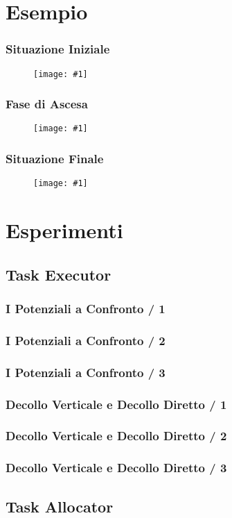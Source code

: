 \documentclass{beamer}
\newcommand{\putimage}[2] {
  \begin{figure}
    \centering
    \texttt{[image: \#1]}
	\end{figure}
}
\begin{document}
\section{Esempio}

\begin{frame}
\frametitle{Situazione Iniziale}
\putimage{images/esempio/iterazione\_zero\_left.png}{0.9}
\end{frame}

\begin{frame}
\frametitle{Fase di Ascesa}
\putimage{images/esempio/iterazione\_venti\_left.png}{0.9}
\end{frame}

\begin{frame}
\frametitle{Situazione Finale}
\putimage{images/esempio/iterazione\_finale\_top.png}{0.9}
\end{frame}

\section{Esperimenti}

\subsection{Task Executor}

\begin{frame}
\frametitle{I Potenziali a Confronto / 1}
\end{frame}

\begin{frame}
\frametitle{I Potenziali a Confronto / 2}
\end{frame}

\begin{frame}
\frametitle{I Potenziali a Confronto / 3}
\end{frame}

\begin{frame}
\frametitle{Decollo Verticale e Decollo Diretto / 1}
\end{frame}

\begin{frame}
\frametitle{Decollo Verticale e Decollo Diretto / 2}
\end{frame}

\begin{frame}
\frametitle{Decollo Verticale e Decollo Diretto / 3}
\end{frame}

\subsection{Task Allocator}
\end{document}

